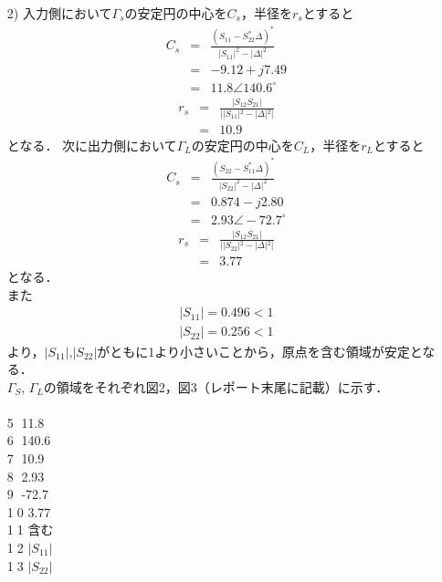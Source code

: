 \begin{itemize}
    \item[2)]
    入力側において$\Gamma_s$の安定円の中心を$C_s$，半径を$r_s$とすると
    \begin{eqnarray*}
        C_s&=&\frac{(S_{11}-S^*_{22}\Delta)^*}{|S_{11}|^2-|\Delta|^2}\\
        &=&-9.12+j7.49\\
        &=&11.8\angle 140.6^\circ
    \end{eqnarray*}
    \begin{eqnarray*}
        r_s&=&\frac{|S_{12}S_{21}|}{||S_{11}|^2-|\Delta|^2|}\\
        &=&10.9
    \end{eqnarray*}
    となる．
    次に出力側において$\Gamma_L$の安定円の中心を$C_L$，半径を$r_L$とすると
    \begin{eqnarray*}
        C_s&=&\frac{(S_{22}-S^*_{11}\Delta)^*}{|S_{22}|^2-|\Delta|^2}\\
        &=&0.874-j2.80\\
        &=&2.93\angle -72.7^\circ
    \end{eqnarray*}
    \begin{eqnarray*}
        r_s&=&\frac{|S_{12}S_{21}|}{||S_{22}|^2-|\Delta|^2|}\\
        &=&3.77
    \end{eqnarray*}
    となる．\\
    また
    \begin{eqnarray*}
        |S_{11}|=0.496<1\\
        |S_{22}|=0.256<1
    \end{eqnarray*}
    より，$|S_{11}|$,$|S_{22}|$がともに1より小さいことから，原点を含む領域が安定となる．\\
    $\Gamma_S$, $\Gamma_L$の領域をそれぞれ図2，図3（レポート末尾に記載）に示す．\\
    \\
    \textcircled{\scriptsize5} 11.8\\
    \textcircled{\scriptsize6} 140.6\\
    \textcircled{\scriptsize7} 10.9\\
    \textcircled{\scriptsize8} 2.93\\
    \textcircled{\scriptsize9} -72.7\\
    \textcircled{\scriptsize10} 3.77\\
    \textcircled{\scriptsize11} 含む\\
    \textcircled{\scriptsize12} $|S_{11}|$\\
    \textcircled{\scriptsize13} $|S_{22}|$


\end{itemize}
